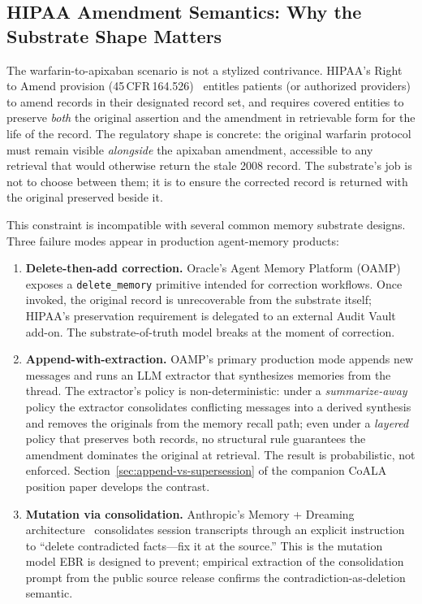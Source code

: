 \documentclass[runningheads]{llncs}
\begin{document}


\subsection{HIPAA Amendment Semantics: Why the Substrate Shape Matters}
\label{sec:hipaa-semantics}

The warfarin-to-apixaban scenario is not a stylized contrivance. HIPAA's
Right to Amend provision (45\,CFR\,164.526)~\cite{hipaaAmendment} entitles
patients (or authorized providers) to amend records in their designated
record set, and requires covered entities to preserve \emph{both} the
original assertion and the amendment in retrievable form for the life of
the record. The regulatory shape is concrete: the original warfarin
protocol must remain visible \emph{alongside} the apixaban amendment,
accessible to any retrieval that would otherwise return the stale 2008
record. The substrate's job is not to choose between them; it is to
ensure the corrected record is returned with the original preserved
beside it.

This constraint is incompatible with several common memory substrate
designs. Three failure modes appear in production agent-memory products:

\begin{enumerate}
  \item \textbf{Delete-then-add correction.} Oracle's Agent Memory
    Platform (OAMP)~\cite{oracleOAMP2026} exposes a \texttt{delete\_memory}
    primitive intended for correction workflows. Once invoked, the
    original record is unrecoverable from the substrate itself; HIPAA's
    preservation requirement is delegated to an external Audit Vault
    add-on. The substrate-of-truth model breaks at the moment of
    correction.
  \item \textbf{Append-with-extraction.} OAMP's primary production mode
    appends new messages and runs an LLM extractor that synthesizes
    memories from the thread. The extractor's policy is
    non-deterministic: under a \emph{summarize-away} policy the extractor
    consolidates conflicting messages into a derived synthesis and
    removes the originals from the memory recall path; even under a
    \emph{layered} policy that preserves both records, no structural rule
    guarantees the amendment dominates the original at retrieval. The
    result is probabilistic, not enforced. Section~\ref{sec:append-vs-supersession}
    of the companion CoALA position paper develops the contrast.
  \item \textbf{Mutation via consolidation.} Anthropic's Memory + Dreaming
    architecture~\cite{anthropicMemoryDreaming2026} consolidates session
    transcripts through an explicit instruction to ``delete contradicted
    facts---fix it at the source.'' This is the mutation model EBR is
    designed to prevent; empirical extraction of the consolidation prompt
    from the public source release confirms the
    contradiction-as-deletion semantic.
\end{enumerate}
\end{document}
